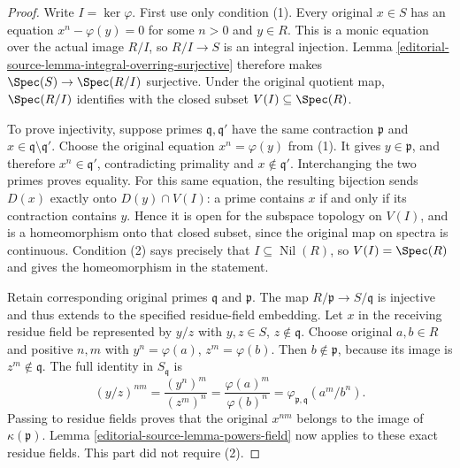 \begin{proof}
Write $I=\ker\varphi$. First use only
condition (1). Every original $x\in S$
has an equation $x^n-\varphi(y)=0$
for some $n>0$ and $y\in R$. This is
a monic equation over the actual image
$R/I$, so $R/I\to S$ is an integral
injection. Lemma
\ref{editorial-source-lemma-integral-overring-surjective}
therefore makes $\Spec(S)\to\Spec(R/I)$
surjective. Under the original quotient
map, $\Spec(R/I)$ identifies with
the closed subset $V(I)\subseteq\Spec(R)$.

To prove injectivity, suppose primes
$\mathfrak q,\mathfrak q'$ have the
same contraction $\mathfrak p$ and
$x\in\mathfrak q\setminus\mathfrak q'$.
Choose the original equation
$x^n=\varphi(y)$ from (1). It gives
$y\in\mathfrak p$, and therefore
$x^n\in\mathfrak q'$, contradicting
primality and $x\notin\mathfrak q'$.
Interchanging the two primes proves
equality. For this same equation,
the resulting bijection sends $D(x)$
exactly onto $D(y)\cap V(I)$: a prime
contains $x$ if and only if its
contraction contains $y$. Hence it
is open for the subspace topology
on $V(I)$, and is a homeomorphism
onto that closed subset, since the
original map on spectra is continuous.
Condition (2) says precisely that
$I\subseteq\operatorname{Nil}(R)$,
so $V(I)=\Spec(R)$ and gives the
homeomorphism in the statement.

Retain corresponding original primes
$\mathfrak q$ and $\mathfrak p$.
The map $R/\mathfrak p\to S/\mathfrak q$
is injective and thus extends to the
specified residue-field embedding.
Let $x$ in the receiving residue
field be represented by $y/z$ with
$y,z\in S$, $z\notin\mathfrak q$.
Choose original $a,b\in R$ and
positive $n,m$ with
$y^n=\varphi(a)$, $z^m=\varphi(b)$.
Then $b\notin\mathfrak p$, because
its image is $z^m\notin\mathfrak q$.
The full identity in $S_{\mathfrak q}$ is
$$
(y/z)^{nm}
=\frac{(y^n)^m}{(z^m)^n}
=\frac{\varphi(a)^m}{\varphi(b)^n}
=\varphi_{\mathfrak p,\mathfrak q}(a^m/b^n).
$$
Passing to residue fields proves
that the original $x^{nm}$ belongs
to the image of $\kappa(\mathfrak p)$.
Lemma \ref{editorial-source-lemma-powers-field} now
applies to these exact residue fields.
This part did not require (2).


\end{proof}

